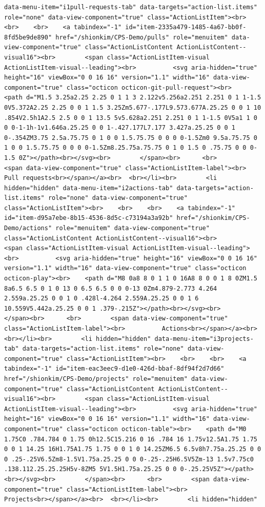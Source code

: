 \documentclass[
  letterpaper,
]{book}
\begin{document}
\begin{verbatim}
data-menu-item="i1pull-requests-tab" data-targets="action-list.items" role="none" data-view-component="true" class="ActionListItem"><br>    <br>    <br>    <a tabindex="-1" id="item-2335a479-1485-4a67-bb0f-8fd5be9de890" href="/shionkim/CPS-Demo/pulls" role="menuitem" data-view-component="true" class="ActionListContent ActionListContent--visual16"><br>        <span class="ActionListItem-visual ActionListItem-visual--leading"><br>          <svg aria-hidden="true" height="16" viewBox="0 0 16 16" version="1.1" width="16" data-view-component="true" class="octicon octicon-git-pull-request"><br>    <path d="M1.5 3.25a2.25 2.25 0 1 1 3 2.122v5.256a2.251 2.251 0 1 1-1.5 0V5.372A2.25 2.25 0 0 1 1.5 3.25Zm5.677-.177L9.573.677A.25.25 0 0 1 10 .854V2.5h1A2.5 2.5 0 0 1 13.5 5v5.628a2.251 2.251 0 1 1-1.5 0V5a1 1 0 0 0-1-1h-1v1.646a.25.25 0 0 1-.427.177L7.177 3.427a.25.25 0 0 1 0-.354ZM3.75 2.5a.75.75 0 1 0 0 1.5.75.75 0 0 0 0-1.5Zm0 9.5a.75.75 0 1 0 0 1.5.75.75 0 0 0 0-1.5Zm8.25.75a.75.75 0 1 0 1.5 0 .75.75 0 0 0-1.5 0Z"></path><br></svg><br>        </span><br>      <br>        <span data-view-component="true" class="ActionListItem-label"><br>          Pull requests<br></span></a><br>  <br></li><br>        <li hidden="hidden" data-menu-item="i2actions-tab" data-targets="action-list.items" role="none" data-view-component="true" class="ActionListItem"><br>    <br>    <br>    <a tabindex="-1" id="item-d95a7ebe-8b15-4536-8d5c-c73194a3a92b" href="/shionkim/CPS-Demo/actions" role="menuitem" data-view-component="true" class="ActionListContent ActionListContent--visual16"><br>        <span class="ActionListItem-visual ActionListItem-visual--leading"><br>          <svg aria-hidden="true" height="16" viewBox="0 0 16 16" version="1.1" width="16" data-view-component="true" class="octicon octicon-play"><br>    <path d="M8 0a8 8 0 1 1 0 16A8 8 0 0 1 8 0ZM1.5 8a6.5 6.5 0 1 0 13 0 6.5 6.5 0 0 0-13 0Zm4.879-2.773 4.264 2.559a.25.25 0 0 1 0 .428l-4.264 2.559A.25.25 0 0 1 6 10.559V5.442a.25.25 0 0 1 .379-.215Z"></path><br></svg><br>        </span><br>      <br>        <span data-view-component="true" class="ActionListItem-label"><br>          Actions<br></span></a><br>  <br></li><br>        <li hidden="hidden" data-menu-item="i3projects-tab" data-targets="action-list.items" role="none" data-view-component="true" class="ActionListItem"><br>    <br>    <br>    <a tabindex="-1" id="item-eac3eec9-d1e0-426d-bbaf-8df94f2d7d66" href="/shionkim/CPS-Demo/projects" role="menuitem" data-view-component="true" class="ActionListContent ActionListContent--visual16"><br>        <span class="ActionListItem-visual ActionListItem-visual--leading"><br>          <svg aria-hidden="true" height="16" viewBox="0 0 16 16" version="1.1" width="16" data-view-component="true" class="octicon octicon-table"><br>    <path d="M0 1.75C0 .784.784 0 1.75 0h12.5C15.216 0 16 .784 16 1.75v12.5A1.75 1.75 0 0 1 14.25 16H1.75A1.75 1.75 0 0 1 0 14.25ZM6.5 6.5v8h7.75a.25.25 0 0 0 .25-.25V6.5Zm8-1.5V1.75a.25.25 0 0 0-.25-.25H6.5V5Zm-13 1.5v7.75c0 .138.112.25.25.25H5v-8ZM5 5V1.5H1.75a.25.25 0 0 0-.25.25V5Z"></path><br></svg><br>        </span><br>      <br>        <span data-view-component="true" class="ActionListItem-label"><br>          Projects<br></span></a><br>  <br></li><br>        <li hidden="hidden" 
\end{verbatim}
\end{document}
